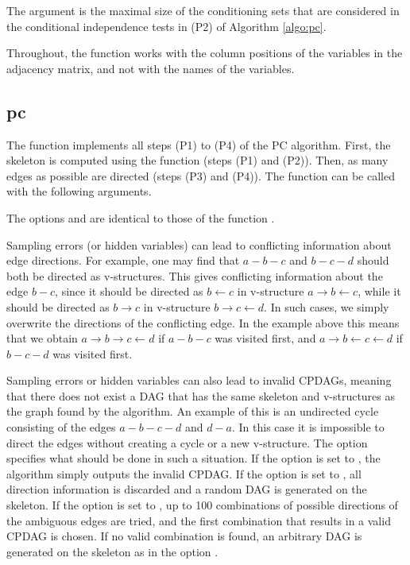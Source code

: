 \documentclass[article]{jss}
\begin{document}
The argument  is the maximal size of the conditioning sets that
are considered in the conditional independence tests in (P2) of Algorithm \ref{algo:pc}.
          
Throughout, the function works with the column positions of the
variables in the adjacency matrix, and not with the names of the variables.

\subsection{pc} \label{sec:pc} 

The function  implements all steps (P1) to (P4) of the PC
algorithm. First, the skeleton is computed using the function
 (steps (P1) and (P2)). Then, as many edges as possible are
directed (steps (P3) and (P4)). The function can be called with the
following arguments.

     
The options  and  are identical to those of the
function .

Sampling errors (or hidden variables) can lead to conflicting information
about edge directions. For example, one may find that $a-b-c$ and $b-c-d$
should both be directed as v-structures.  This gives conflicting
information about the edge $b-c$, since it should be directed as $b
\leftarrow c$ in v-structure $a \rightarrow b \leftarrow c$, while it
should be directed as $b \rightarrow c$ in v-structure $b \rightarrow c
\leftarrow d$. In such cases, we simply overwrite the directions of the
conflicting edge. In the example above this means that we obtain $a
\rightarrow b \rightarrow c \leftarrow d$ if $a-b-c$ was visited first, and
$a \rightarrow b \leftarrow c \leftarrow d$ if $b-c-d$ was visited first.

Sampling errors or hidden variables can also lead to invalid CPDAGs,
meaning that there does not exist a DAG that has the same skeleton and
v-structures as the graph found by the algorithm. An example of this is an
undirected cycle consisting of the edges $a-b-c-d$ and $d-a$. In this case it
is impossible to direct the edges without creating a cycle or a new
v-structure. The option  specifies what should be done in such a
situation. If the option is set to , the algorithm simply
outputs the invalid CPDAG. If the option is set to , all direction
information is discarded and a random DAG is generated on the skeleton. If
the option is set to , up to 100 combinations of possible
directions of the ambiguous edges are tried, and the first combination that
results in a valid CPDAG is chosen. If no valid combination is found, an
arbitrary DAG is generated on the skeleton as in the option .
\end{document}
